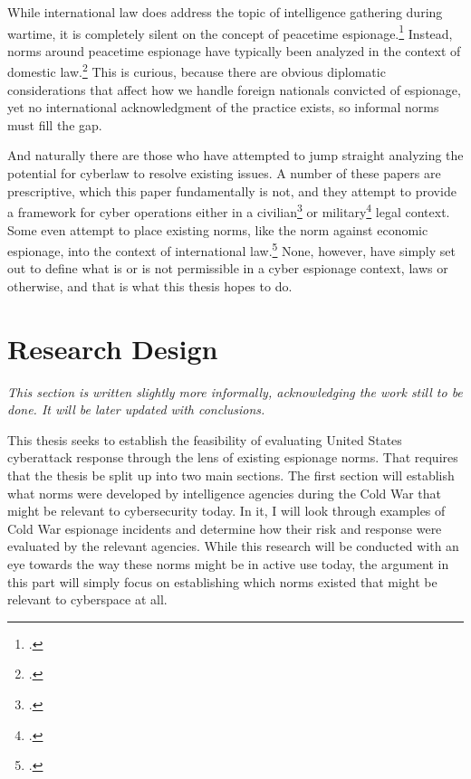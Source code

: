 \documentclass{report}
\begin{document}
\begin{refsegment}
While international law does address the topic of intelligence gathering during wartime, it is completely silent on the concept of peacetime espionage.\footcite{radsan_unresolved_2007} Instead, norms around peacetime espionage have typically been analyzed in the context of domestic law.\footcite{demarest_espionage_1995} This is curious, because there are obvious diplomatic considerations that affect how we handle foreign nationals convicted of espionage, yet no international acknowledgment of the practice exists, so informal norms must fill the gap.

And naturally there are those who have attempted to jump straight analyzing the potential for cyberlaw to resolve existing issues. A number of these papers are prescriptive, which this paper fundamentally is not, and they attempt to provide a framework for cyber operations either in a civilian\footcite{yurcik_internet_2001} or military\footcite{kehler_rules_2017} legal context. Some even attempt to place existing norms, like the norm against economic espionage, into the context of international law.\footcite{lotrionte_countering_2015} None, however, have simply set out to define what is or is not permissible in a cyber espionage context, laws or otherwise, and that is what this thesis hopes to do.

\section{Research Design}
\emph{This section is written slightly more informally, acknowledging the work still to be done. It will be later updated with conclusions.}

This thesis seeks to establish the feasibility of evaluating United States cyberattack response through the lens of existing espionage norms. That requires that the thesis be split up into two main sections. The first section will establish what norms were developed by intelligence agencies during the Cold War that might be relevant to cybersecurity today. In it, I will look through examples of Cold War espionage incidents and determine how their risk and response were evaluated by the relevant agencies. While this research will be conducted with an eye towards the way these norms might be in active use today, the argument in this part will simply focus on establishing which norms existed that might be relevant to cyberspace at all.


\end{refsegment}
\end{document}
